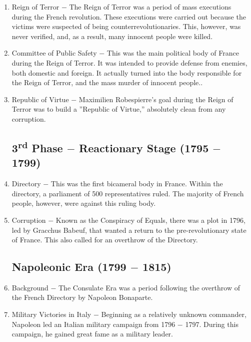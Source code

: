 \documentclass[12pt]{article}
\begin{document}
\begin{enumerate}
\item Reign of Terror $-$ The Reign of Terror was a period of mass executions during the French revolution. These executions were carried out because the victims were suspected of being counterrevolutionaries. This, however, was never verified, and, as a result, many innocent people were killed. 

\item Committee of Public Safety $-$ This was the main political body of France during the Reign of Terror. It was intended to provide defense from enemies, both domestic and foreign. It actually turned into the body responsible for the Reign of Terror, and the mass murder of innocent people..

\item Republic of Virtue $-$ Maximilien Robespierre's goal during the Reign of Terror was to build a ''Republic of Virtue,'' absolutely clean from any corruption. 

\subsection{3\textsuperscript{rd} Phase $-$ Reactionary Stage (1795 $-$ 1799)}

\item Directory $-$ This was the first bicameral body in France. Within the directory, a parliament of 500 representatives ruled. The majority of French people, however, were against this ruling body.

\item Corruption $-$ Known as the Conspiracy of Equals, there was a plot in 1796, led by Gracchus Babeuf, that wanted a return to the pre-revolutionary state of France. This also called for an overthrow of the Directory. 

\subsection{Napoleonic Era (1799 $-$ 1815)}

\item Background $-$ The Consulate Era was a period following the overthrow of the French Directory by Napoleon Bonaparte.

\item Military Victories in Italy $-$ Beginning as a relatively unknown commander, Napoleon led an Italian military campaign from 1796 $-$ 1797. During this campaign, he gained great fame as a military leader. 


\end{enumerate}
\end{document}
